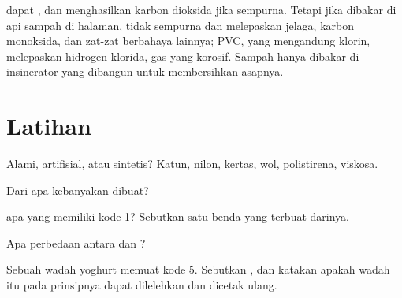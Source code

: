 \begin{remark}\label{rem:g8:plastics:burning}
 dapat , dan menghasilkan karbon dioksida jika 
sempurna. Tetapi jika dibakar di api  sampah di halaman,
  tidak sempurna dan melepaskan jelaga, karbon
monoksida, dan zat-zat berbahaya lainnya; PVC, yang mengandung klorin,
melepaskan hidrogen klorida, gas yang korosif. Sampah  hanya
dibakar di insinerator yang dibangun untuk membersihkan asapnya.
\end{remark}

\section{Latihan}

\begin{exercise}[$\star$]\label{exo:g8:plastics:1}
Alami, artifisial, atau sintetis? Katun, nilon, kertas, wol,
polistirena, viskosa.
\end{exercise}

\begin{exercise}[$\star$]\label{exo:g8:plastics:2}
Dari  apa kebanyakan  dibuat?
\end{exercise}

\begin{exercise}[$\star$]\label{exo:g8:plastics:3}
 apa yang memiliki kode 1? Sebutkan satu benda yang terbuat
darinya.
\end{exercise}

\begin{exercise}[$\star$]\label{exo:g8:plastics:4}
Apa perbedaan antara  dan ?
\end{exercise}

\begin{exercise}[$\star\star$]\label{exo:g8:plastics:5}
Sebuah wadah yoghurt memuat kode 5. Sebutkan , dan katakan
apakah wadah itu pada prinsipnya dapat dilelehkan dan dicetak ulang.
\end{exercise}

